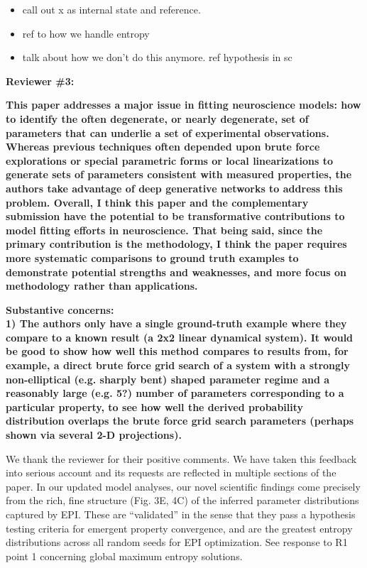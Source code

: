 \documentclass[11pt,a4paper]{article}
\begin{document}
\begin{itemize}
\item call out x as internal state and reference.
\item ref to how we handle entropy
\item talk about how we don't do this anymore.  ref hypothesis in sc
\end{itemize}

{\Large \textbf{Reviewer \#3:}}

\textbf{This paper addresses a major issue in fitting neuroscience models: how to identify the often degenerate, or nearly degenerate, set of parameters that can underlie a set of experimental observations. Whereas previous techniques often depended upon brute force explorations or special parametric forms or local linearizations to generate sets of parameters consistent with measured properties, the authors take advantage of deep generative networks to address this problem. Overall, I think this paper and the complementary submission have the potential to be transformative contributions to model fitting efforts in neuroscience. That being said, since the primary contribution is the methodology, I think the paper requires more systematic comparisons to ground truth examples to demonstrate potential strengths and weaknesses, and more focus on methodology rather than applications. }

\textbf{Substantive concerns: \\
1) The authors only have a single ground-truth example where they compare to a known result (a 2x2 linear dynamical system). It would be good to show how well this method compares to results from, for example, a direct brute force grid search of a system with a strongly non-elliptical (e.g. sharply bent) shaped parameter regime and a reasonably large (e.g. 5?) number of parameters corresponding to a particular property, to see how well the derived probability distribution overlaps the brute force grid search parameters (perhaps shown via several 2-D projections). }

We thank the reviewer for their positive comments.  We have taken this feedback into serious account and its requests are reflected in multiple sections of the paper. In our updated model analyses, our novel scientific findings come precisely from the rich, fine structure (Fig. 3E, 4C) of the inferred parameter distributions captured by EPI.  These are “validated” in the sense that they pass a hypothesis testing criteria for emergent property convergence, and are the greatest entropy distributions across all random seeds for EPI optimization.  See response to R1 point 1 concerning global maximum entropy solutions.
\end{document}
